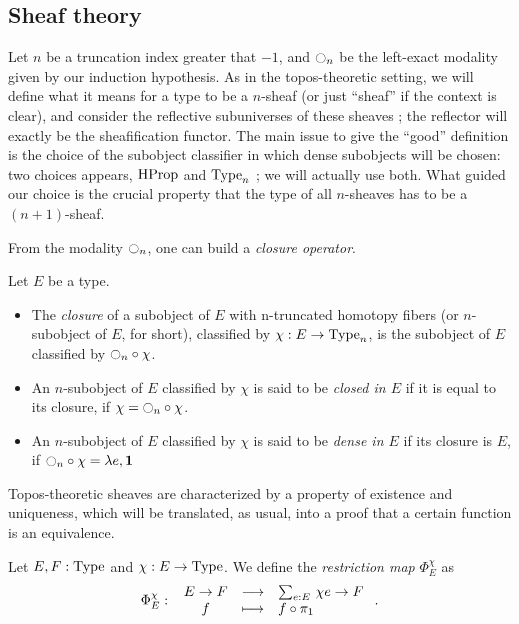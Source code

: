 \subsection{Sheaf theory}
\label{ssec:sheaves}

Let $n$ be a truncation index greater that $-1$, and $\ocircle_n$ be the
left-exact modality given by our induction hypothesis. As in the
topos-theoretic setting, we will define what it means for a type to be
a $n$-sheaf (or just ``sheaf'' if the context is clear), and consider
the reflective subuniverses of these sheaves ; the reflector will
exactly be the sheafification functor.
The main issue to give the ``good'' definition is the choice of the
subobject classifier in which dense subobjects will be chosen: two
choices appears, $\operatorname{HProp}$ and $\operatorname{Type}_n$ ; we will actually use
both. What guided our choice is the crucial property that the type of
all $n$-sheaves has to be a $(n+1)$-sheaf.

From the modality $\ocircle_n$, one can build a {\em closure operator}.

\begin{defi}
  Let $E$ be a type. 
  \begin{itemize}

  \item The {\em closure} of a subobject of $E$ with
  n-truncated homotopy fibers (or $n$-subobject of $E$, for short),
  classified by $\chi : E \to \operatorname{Type}_n$, is the subobject of $E$
  classified by $\ocircle_n \circ \chi$.

  
\item An $n$-subobject of $E$ classified by $\chi$ is said to be {\em
    closed in $E$} if it is equal to its closure, \ie{} if
  $\chi = \ocircle_n \circ \chi$.

  
\item An $n$-subobject of $E$ classified by $\chi$ is said to be {\em
    dense in $E$} if its closure is $E$, \ie{} if 
  $\ocircle_n \circ \chi = \lambda e, \mathbf{1}$ 
  \end{itemize}
\end{defi}


Topos-theoretic sheaves are characterized by a property of existence
and uniqueness, which will be translated, as usual, into a proof that
a certain function is an equivalence.

\begin{defi}
  Let $E,F:\operatorname{Type}$ and $\chi:E\to\operatorname{Type}$. We define the {\em
    restriction map} $\Phi_E^\chi$ as
  \[
    \Phi_E^\chi \, \colon \left. \begin{array}{ccl} E\to F & \longrightarrow & \sum_{e:E}\, \chi e \to F \\ f & \longmapsto & f\circ \pi_1 \end{array} \right..
  \]
\end{defi}

